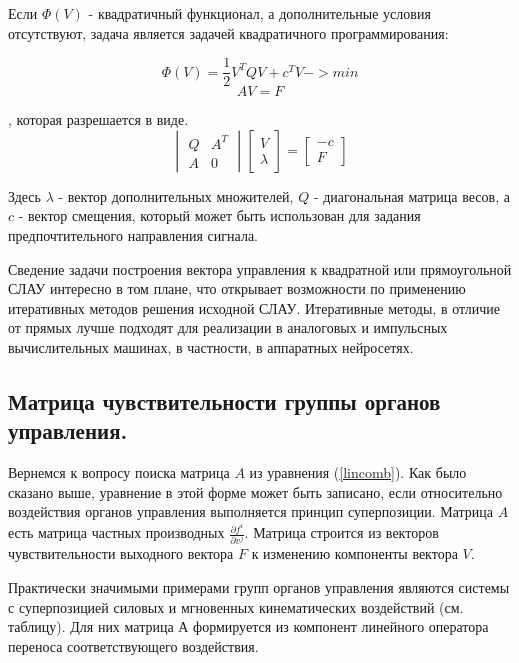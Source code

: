Если $\Phi(V)$ - квадратичный функционал, а дополнительные условия отсутствуют, задача
 является задачей квадратичного программирования:

\begin{equation}\Phi(V) = \frac{1}{2}V^TQV+c^TV -> min\end{equation}
\begin{equation}AV = F\end{equation}

, которая разрешается в виде.
\begin{equation} \label{slau}
\begin{vmatrix}
Q & A^T\\
A & 0
\end{vmatrix}
\begin{bmatrix}
V\\
\lambda
\end{bmatrix}
=
\begin{bmatrix}
-c\\
F
\end{bmatrix}
\end{equation}

Здесь $\lambda$ - вектор дополнительных множителей, $Q$ - диагональная матрица весов, а $c$ - вектор смещения, который может быть использован для задания предпочтительного направления сигнала. 

Сведение задачи построения вектора управления к квадратной или прямоугольной СЛАУ интересно в том плане, что открывает возможности по применению итеративных методов решения исходной СЛАУ. Итеративные методы, в отличие от прямых лучше подходят для реализации в аналоговых и импульсных вычислительных машинах, в частности, в аппаратных нейросетях.

\subsection{Матрица чувствительности группы органов управления.}
Вернемся к вопросу поиска матрица $A$ из уравнения (\ref{lincomb}). Как было сказано выше, уравнение в этой форме может быть записано, если относительно воздействия органов управления выполняется принцип суперпозиции. Матрица $A$ есть матрица частных производных $\frac{\partial{f^i}}{\partial{v^j}}$. Матрица строится из векторов чувствительности выходного вектора $F$ к изменению компоненты вектора $V$.

Практически значимыми примерами групп органов управления являются системы с суперпозицией силовых и мгновенных кинематических воздействий (см. таблицу). Для них матрица $А$ формируется из компонент линейного оператора переноса соответствующего воздействия.

